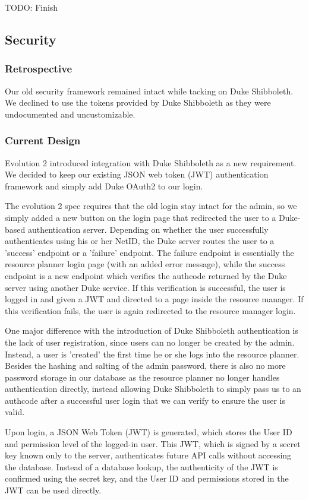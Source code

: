 \documentclass[12pt]{article}
\begin{document}
TODO: Finish

\subsection{Security}
\subsubsection{Retrospective}
Our old security framework remained intact while tacking on Duke Shibboleth. We declined to use the tokens provided by Duke Shibboleth as they were undocumented and uncustomizable. 

\subsubsection{Current Design}
Evolution 2 introduced integration with Duke Shibboleth as a new requirement. We decided to keep our existing JSON web token (JWT) authentication framework and simply add Duke OAuth2 to our login. 

The evolution 2 spec requires that the old login stay intact for the admin, so we simply added a new button on the login page that redirected the user to a Duke-based authentication server. Depending on whether the user successfully authenticates using his or her NetID, the Duke server routes the user to a 'success' endpoint or a 'failure' endpoint. The failure endpoint is essentially the resource planner login page (with an added error message), while the success endpoint is a new endpoint which verifies the authcode returned by the Duke server using another Duke service. If this verification is successful, the user is logged in and given a JWT and directed to a page inside the resource manager. If this verification fails, the user is again redirected to the resource manager login. 

One major difference with the introduction of Duke Shibboleth authentication is the lack of user registration, since users can no longer be created by the admin. Instead, a user is 'created' the first time he or she logs into the resource planner. Besides the hashing and salting of the admin password, there is also no more password storage in our database as the resource planner no longer handles authentication directly, instead allowing Duke Shibboleth to simply pass us to an authcode after a successful user login that we can verify to ensure the user is valid. 

Upon login, a JSON Web Token (JWT) is generated, which stores the User ID and permission level of the logged-in user. This JWT, which is signed by a secret key known only to the server, authenticates future API calls without accessing the database. Instead of a database lookup, the authenticity of the JWT is confirmed using the secret key, and the User ID and permissions stored in the JWT can be used directly. 
\end{document}

